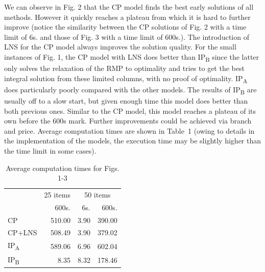 \documentclass{llncs}
\begin{document}
We can observe in Fig. 2 that the CP model finds the best early solutions of all methods. However it quickly reaches a plateau from which it is hard to further improve (notice the similarity between the CP solutions of Fig. 2 with a time limit of 6s. and those of Fig. 3 with a time limit of 600s.). The introduction of LNS for the CP model always improves the solution quality. For the small instances of Fig. 1, the CP model with LNS does better than IP\textsubscript{B} since the latter only solves the relaxation of the RMP to optimality and tries to get the best integral solution from these limited columns, with no proof of optimality. IP\textsubscript{A} does particularly poorly compared with the other models. The results of IP\textsubscript{B} are usually off to a slow start, but given enough time this model does better than both previous ones. Similar to the CP model, this model reaches a plateau of its own before the 600s mark. Further improvements could be achieved via branch and price. Average computation times are shown in Table~1 (owing to details in the implementation of the models, the execution time may be slightly higher than the time limit in some cases).


\begin{table}[H]
  \centering
  \setlength{\tabcolsep}{8pt}
\caption{Average computation times for Figs. 1-3}
\begin{tabular}{lrrr}
  \cline{2-4}\noalign{\smallskip}
  & \multicolumn{1}{c}{25 items} & \multicolumn{2}{c}{50 items} \\
  \cline{2-4}\noalign{\smallskip}
& 600s. & 6s. & 600s. \\
\noalign{\smallskip}
\hline
\noalign{\smallskip}
CP    & 510.00 & 3.90 & 390.00 \\
CP+LNS & 508.49 & 3.90 & 379.02 \\
IP\textsubscript{A} & 589.06 & 6.96 & 602.04 \\
IP\textsubscript{B} & 8.35 & 8.32 & 178.46 \\
\hline
\end{tabular}
\end{table}
\end{document}

